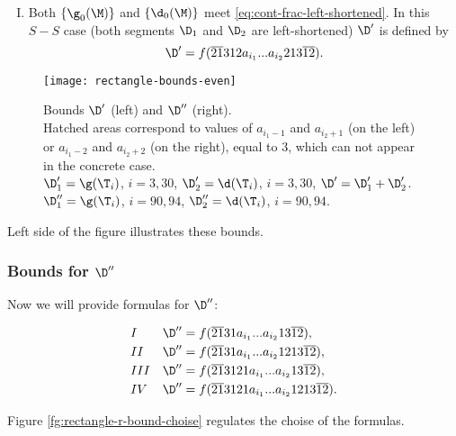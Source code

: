 \begin{enumerate}[I.]
	\item Both $\{\g_0(\M)\}$ and $\{\d_0(\M)\}$
	meet \ref{eq:cont-frac-left-shortened}.
	In this $S-S$ case
	(both segments $\D_1$ and $\D_2$ are left-shortened)
	$\D'$ is defined by
	\begin{equation}
		\D' = f(\overline{21}312a_{i_1}... a_{i_2}213\overline{12}).
	\end{equation}
\end{enumerate}

\begin{figure}[p]
	\centering
	\texttt{[image: rectangle-bounds-even]}
	\caption{
		Bounds $\D'$ (left) and $\D''$ (right).\\
		Hatched areas correspond to values of $a_{i_1 - 1}$ and $a_{i_2 + 1}$ (on the left)
		or $a_{i_1 - 2}$ and $a_{i_2 + 2}$ (on the right), equal to 3,
		which can not appear in the concrete case. \\
		$\D_1' = \g(\T_i)$, $i=3,30$,
		$\D_2' = \d  (\T_i)$, $i=3,30$,
		$\D' = \D_1' + \D_2'$. \\
		$\D_1'' = \g(\T_i)$, $i = 90, 94$,
		$\D_2'' = \d  (\T_i)$, $i = 90, 94$.
	}
	\label{fg:rectangle-bounds-even}
\end{figure}

Left side of the figure  illustrates these bounds.

\subsubsection{Bounds for $\D''$}
Now we will provide formulas for $\D''$:

\begin{subequations}
	\begin{align}
		\label{eq:bound-r-nnn}
		&&&&& I & \D'' & = f(\overline{21}31a_{i_1}... a_{i_2}13\overline{12}), &&&& \\
		\label{eq:bound-r-nns-ns}
		&&&&& II & \D'' & = f(\overline{21}31a_{i_1}... a_{i_2}1213\overline{12}), &&&& \\
		\label{eq:bound-r-ns}
		&&&&& III & \D'' & = f(\overline{21}3121a_{i_1}... a_{i_2}13\overline{12}), &&&& \\
		\label{eq:bound-r-sn}
		&&&&& IV & \D'' & = f(\overline{21}3121a_{i_1}... a_{i_2}1213\overline{12}). &&&&
	\end{align}
\end{subequations}

Figure \ref{fg:rectangle-r-bound-choise} regulates the choise of the formulas.


